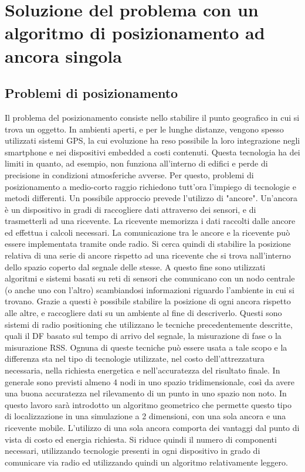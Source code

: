 \chapter{Soluzione del problema con un algoritmo di posizionamento ad ancora singola}
\section{Problemi di posizionamento}
Il problema del posizionamento consiste nello stabilire il punto geografico in cui si trova un oggetto. In ambienti aperti, e per le lunghe distanze, vengono spesso utilizzati sistemi GPS, la cui evoluzione ha reso possibile la loro integrazione negli smartphone e nei dispositivi embedded a costi contenuti. Questa tecnologia ha dei limiti in quanto, ad esempio, non funziona all'interno di edifici e perde di precisione in condizioni atmosferiche avverse. Per questo, problemi di posizionamento a medio-corto raggio richiedono tutt'ora l'impiego di tecnologie  e metodi differenti. Un possibile approccio prevede l'utilizzo di "ancore". Un'ancora è un dispositivo in gradi di raccogliere dati attraverso dei sensori, e di trasmetterli ad una ricevente. La ricevente memorizza i dati raccolti dalle ancore ed effettua i calcoli necessari. La comunicazione tra le ancore e la ricevente può essere implementata tramite onde radio. Si cerca quindi di stabilire la posizione relativa di una serie di ancore rispetto ad una ricevente che si trova nall'interno dello spazio coperto dal segnale delle stesse.
A questo fine sono utilizzati algoritmi e sistemi basati su reti di sensori che comunicano con un nodo centrale (o anche uno con l'altro) scambiandosi informazioni riguardo l'ambiente in cui si trovano. Grazie a questi è possibile stabilire la posizione di ogni ancora rispetto alle altre, e raccogliere dati su un ambiente al fine di descriverlo. 
Questi sono sistemi di radio positioning che utilizzano le tecniche precedentemente descritte, quali il DF basato sul tempo di arrivo del segnale, la misurazione di fase o la misurazione RSS. Ognuna di queste tecniche può essere usata a tale scopo e la differenza sta nel tipo di tecnologie utilizzate, nel costo dell'attrezzatura necessaria, nella richiesta energetica e nell'accuratezza del risultato finale.
In generale sono previsti almeno 4 nodi in uno spazio tridimensionale, così da avere una buona accuratezza nel rilevamento di un punto in uno spazio non noto. In questo lavoro sarà introdotto un algoritmo geometrico che permette questo tipo di localizzazione in una simulazione a 2 dimensioni, con una sola ancora e una ricevente mobile. L'utilizzo di una sola ancora comporta dei vantaggi dal punto di vista di costo ed energia richiesta. Si riduce quindi il numero di componenti necessari, utilizzando tecnologie presenti in ogni dispositivo in grado di comunicare via radio ed utilizzando quindi un algoritmo relativamente leggero.
	
